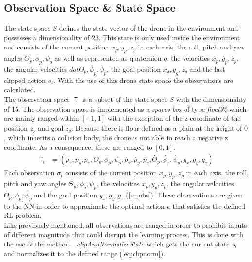 \subsection{Observation Space \& State Space}
The state space $S$ defines the state vector of the drone in the environment and possesses a dimensionality of $23$. 
This state is only used inside the environment and consists of the current position $x_p, y_p, z_p$ in each axis,
 the roll, pitch and yaw angles $\Theta_p, \phi_p, \psi_p$ as well as represented as quaternion $q$, 
 the velocities $\dot{x_p}, \dot{y_p}, \dot{z_p}$, the angular velocities $dot{\Theta_p}, \dot{\phi_p}, \dot{\psi_p}$, 
 the goal position $x_g, y_g, z_g$ and the last clipped action $a_t$. With the use of this drone state space the observations are calculated.\\
\newline
The observation space $\daleth$ is a subset of the state space $S$ with the dimensionality of 15. 
The observation space is implemented as a \emph{spaces box} of type \emph{float32} which are mainly ranged within $[-1, 1]$ 
with the exception of the z coordinate of the position $z_p$ and goal $z_g$. 
Because there is floor defined as a plain at the height of $0$, which inherits a collision body, 
the drone is not able to reach a negative z coordinate. As a consequence, these are ranged to $[0,1]$.
\newline
\begin{align}
	\daleth_t &= (p_x,p_y,p_z, \Theta_p, \phi_p, \psi_p, \dot{p_x}, \dot{p_y}, \dot{p_z}, \dot{\Theta_p}, \dot{\phi_p}, \dot{\psi_p}, g_x, g_y, g_z) \label{eq:obs}
\end{align}
\newline
Each observation $\sigma_t$ consists of the current position $x_p, y_p, z_p$ in each axis, 
the roll, pitch and yaw angles $\Theta_p, \phi_p, \psi_p$, the velocities $\dot{x_p}, \dot{y_p}, \dot{z_p}$, 
the angular velocities $\dot{\Theta_p}, \dot{\phi_p}, \dot{\psi_p}$ and the goal position $g_x, g_y, g_z$ (\cref{eq:obs}). 
These observations are given to the NN in order to approximate the optimal action $a$ that satisfies the defined RL problem.\\
\newline
Like previously mentioned, all observations are ranged in order to prohibit inputs of different magnitude that could disrupt the learning process. 
This is done with the use of the method \emph{\_clipAndNormalizeState} which gets the current state $s_t$ and normalizes it to the defined range (\cref{eq:clipnorm}). 
